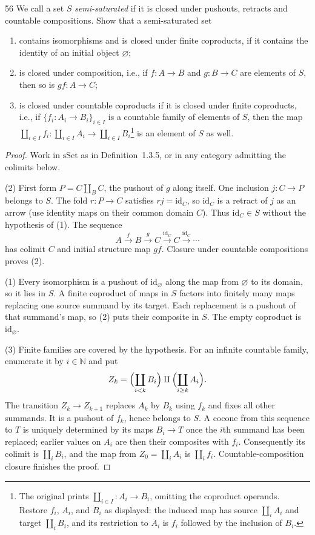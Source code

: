 \begin{exercise}{56}
We call a set $S$ \emph{semi-saturated} if it is closed under pushouts, retracts and
countable compositions. Show that a semi-saturated set
\begin{enumerate}[label=(\arabic*)]
\item contains isomorphisms and is closed under finite coproducts, if it contains the identity of
an initial object $\varnothing$;
\item is closed under composition, i.e., if $f\colon A\to B$ and $g\colon B\to C$ are elements of $S$, then
so is $gf\colon A\to C$;
\item is closed under countable coproducts if it is closed under finite coproducts, i.e., if
$\{f_i\colon A_i\to B_i\}_{i\in I}$ is a countable family of elements of $S$, then the map $\coprod_{i\in I}f_i\colon\allowbreak\coprod_{i\in I}A_i\to\coprod_{i\in I}B_i$\footnote{The original prints $\coprod_{i\in I}\colon A_i\to B_i$, omitting the coproduct operands. Restore $f_i$, $A_i$, and $B_i$ as displayed: the induced map has source $\coprod_iA_i$ and target $\coprod_iB_i$, and its restriction to $A_i$ is $f_i$ followed by the inclusion of $B_i$.} is
an element of $S$ as well.
\end{enumerate}

\begin{proof}
Work in $\mathrm{sSet}$ as in Definition~1.3.5, or in any
category admitting the colimits below.

(2) First form $P=C\amalg_B C$, the pushout of $g$ along itself.
One inclusion $j\colon C\to P$ belongs to $S$.
The fold $r\colon P\to C$ satisfies $rj=\mathrm{id}_C$,
so $\mathrm{id}_C$ is a retract of $j$ as an arrow
(use identity maps on their common domain $C$).
Thus $\mathrm{id}_C\in S$ without the hypothesis of (1).
The sequence
\[
 A\xrightarrow{f}B\xrightarrow{g}C
 \xrightarrow{\mathrm{id}_C}C\xrightarrow{\mathrm{id}_C}\cdots
\]
has colimit $C$ and initial structure map $gf$.
Closure under countable compositions proves (2).

(1) Every isomorphism is a pushout of
$\mathrm{id}_{\varnothing}$ along the map from $\varnothing$
to its domain, so it lies in $S$.
A finite coproduct of maps in $S$ factors into finitely many
maps replacing one source summand by its target.
Each replacement is a pushout of that summand's map,
so (2) puts their composite in $S$.
The empty coproduct is $\mathrm{id}_{\varnothing}$.

(3) Finite families are covered by the hypothesis.
For an infinite countable family, enumerate it by $i\in\mathbb N$
and put
\[
 Z_k=\Bigl(\coprod_{i<k}B_i\Bigr)
       \amalg\Bigl(\coprod_{i\ge k}A_i\Bigr).
\]
The transition $Z_k\to Z_{k+1}$ replaces $A_k$ by $B_k$
using $f_k$ and fixes all other summands.
It is a pushout of $f_k$, hence belongs to $S$.
A cocone from this sequence to $T$ is uniquely determined
by its maps $B_i\to T$ once the $i$th summand has been replaced;
earlier values on $A_i$ are then their composites with $f_i$.
Consequently its colimit is $\coprod_iB_i$,
and the map from $Z_0=\coprod_iA_i$ is $\coprod_i f_i$.
Countable-composition closure finishes the proof.
\end{proof}
\end{exercise}
